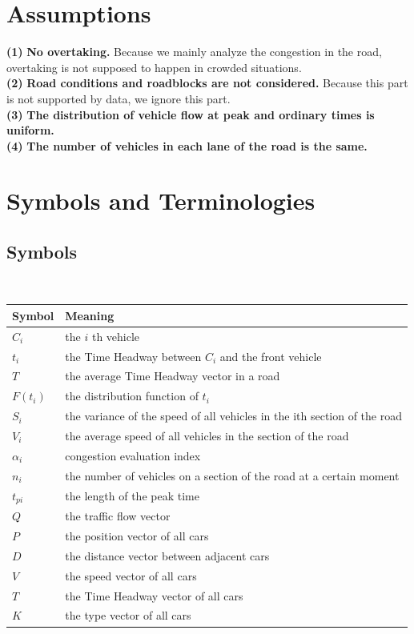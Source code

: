 \documentclass{mcmthesis}
\begin{document}
\section{Assumptions}%
\noindent
{\bf (1) } \textbf{No overtaking.} Because we mainly analyze the congestion in the road, overtaking is not supposed to happen in crowded situations.\\
{\bf (2) } \textbf{Road conditions and roadblocks are not considered.} Because this part is not supported by data, we ignore this part.\\
{\bf (3) } \textbf{The distribution of vehicle flow at peak and ordinary times is uniform.}\\
{\bf (4) } \textbf{The number of vehicles in each lane of the road is the same.}
\section{Symbols and Terminologies}
\subsection{Symbols}
\begin{table}[H]
        \setlength{\abovecaptionskip}{0pt}
        \setlength{\belowcaptionskip}{0pt}
         \\
        \begin{tabular}{p{1.8cm}|p{12cm}}
        \hline
        \rowcolor[gray]{0.9}\bf{Symbol} &\bf{Meaning}\\
        \hline
        $C_{i}$	 &the $i$ th vehicle\\
        $t_{i}$	&the Time Headway between $ C_{i} $ and the front vehicle\\
        $T$	&the average Time Headway vector in a road\\
        $F(t_{i})$ &the distribution function of $t_{i}$\\
		$S_{i}$	&the variance of the speed of all vehicles in the ith section of the road \\    
		$V_{i}$	&the average speed of all vehicles in the section of the road  \\
		$\alpha_{i}$ &congestion evaluation index \\
		$n_i$ &the number of vehicles on a section of the road at a certain moment\\
		$t_{pi}$ &the length of the peak time \\
		$Q$ &the traffic flow vector\\
		$P$ &the position vector of all cars\\
		$D$ &the distance vector between adjacent cars\\
		$V$ &the speed vector of all cars\\
		$T$ &the Time Headway vector of all cars\\
		$K$ &the type vector of all cars
        \end{tabular}
        \end{table}
\end{document}
